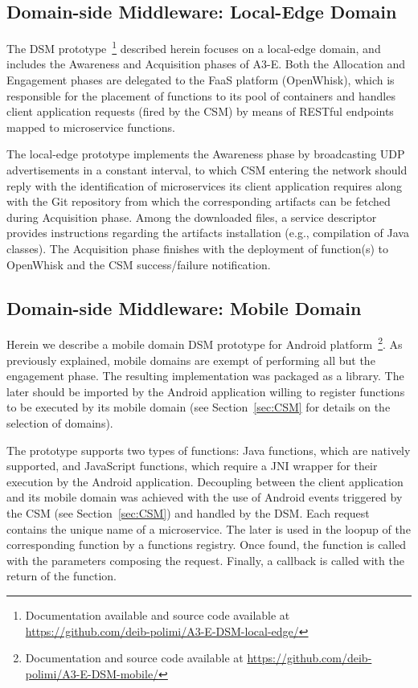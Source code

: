 \subsection{Domain-side Middleware: Local-Edge Domain}\label{sec:local-edge-domain-DSM}


The DSM prototype~\footnote{Documentation available and source code available at \url{https://github.com/deib-polimi/A3-E-DSM-local-edge/}} described herein focuses on a local-edge domain, and includes the Awareness and Acquisition phases of A3-E. Both the Allocation and Engagement phases are delegated to the FaaS platform (OpenWhisk), which is responsible for the placement of functions to its pool of containers and handles client application requests (fired by the CSM) by means of RESTful endpoints mapped to microservice functions.

The local-edge prototype implements the Awareness phase by broadcasting UDP advertisements in a constant interval, to which CSM entering the network should reply with the identification of microservices its client application requires along with the Git repository from which the corresponding artifacts can be fetched during Acquisition phase. Among the downloaded files, a service descriptor provides instructions regarding the artifacts installation (e.g., compilation of Java classes). The Acquisition phase finishes with the deployment of function(s) to OpenWhisk and the CSM success/failure notification. 

\subsection{Domain-side Middleware: Mobile Domain}\label{sec:mobile-domain-DSM}

Herein we describe a mobile domain DSM prototype for Android platform~\footnote{Documentation and source code available at \url{https://github.com/deib-polimi/A3-E-DSM-mobile/}}. As previously explained, mobile domains are exempt of performing all but the engagement phase. The resulting implementation was packaged as a library. The later should be imported by the Android application willing to register functions to be executed by its mobile domain (see Section~\ref{sec:CSM} for details on the selection of domains).

The prototype supports two types of functions: Java functions, which are natively supported, and JavaScript functions, which require a JNI wrapper for their execution by the Android application. Decoupling between the client application and its mobile domain was achieved with the use of Android events triggered by the CSM (see Section~\ref{sec:CSM}) and handled by the DSM. Each request contains the unique name of a microservice. The later is used in the loopup of the corresponding function by a functions registry. Once found, the function is called with the parameters composing the request. Finally, a callback is called with the return of the function.